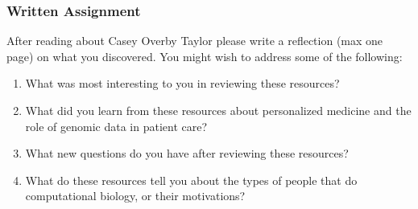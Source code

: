 \documentclass{article}
\begin{document}
\subsubsection*{Written Assignment} 
After reading about Casey Overby Taylor please write a reflection (max one page) on what you discovered. You might wish to address some of the following: 

\begin{enumerate}
\item What was most interesting to you in reviewing these resources?
\item What did you learn from these resources about personalized medicine and the role of genomic data in patient care?
\item What new questions do you have after reviewing these resources?
\item What do these resources tell you about the types of people that do computational biology, or their motivations?
\end{enumerate}
\EndAccSupp{}
\end{document}
